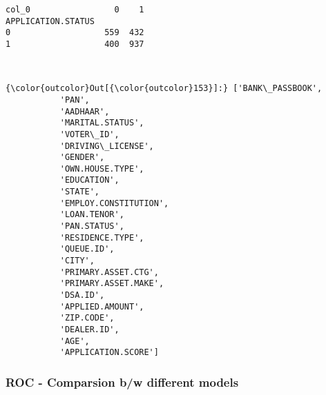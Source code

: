\documentclass[11pt]{article}
\begin{document}
    
    \begin{verbatim}
col_0                 0    1
APPLICATION.STATUS          
0                   559  432
1                   400  937
    \end{verbatim}

    
    \begin{center}
    \end{center}
    { \hspace*{\fill} \\}
    
\begin{Verbatim}[commandchars=\\\{\}]
{\color{outcolor}Out[{\color{outcolor}153}]:} ['BANK\_PASSBOOK',
           'PAN',
           'AADHAAR',
           'MARITAL.STATUS',
           'VOTER\_ID',
           'DRIVING\_LICENSE',
           'GENDER',
           'OWN.HOUSE.TYPE',
           'EDUCATION',
           'STATE',
           'EMPLOY.CONSTITUTION',
           'LOAN.TENOR',
           'PAN.STATUS',
           'RESIDENCE.TYPE',
           'QUEUE.ID',
           'CITY',
           'PRIMARY.ASSET.CTG',
           'PRIMARY.ASSET.MAKE',
           'DSA.ID',
           'APPLIED.AMOUNT',
           'ZIP.CODE',
           'DEALER.ID',
           'AGE',
           'APPLICATION.SCORE']
\end{Verbatim}
            
    \subsubsection{ROC - Comparsion b/w different
models}\label{roc---comparsion-bw-different-models}
\end{document}
